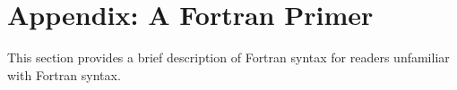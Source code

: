 \section*{Appendix: A Fortran Primer}

This section provides a brief description of Fortran syntax for readers unfamiliar with Fortran syntax.
